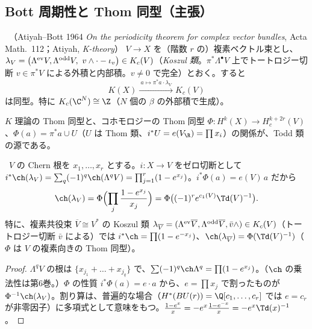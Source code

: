 \subsection{Bott 周期性と Thom 同型（主張）}
\begin{thm}\label{thm:Bott}\tC\ （Atiyah--Bott 1964 \emph{On the periodicity theorem for complex vector bundles}, Acta Math.\ 112；Atiyah, \emph{K-theory}）
$V\to X$ を（階数 $r$ の）複素ベクトル束とし、$\lambda_V=\bigl(\Lambda^{\rm ev}V,\Lambda^{\rm odd}V,\ v\wedge\cdot-\iota_v\bigr)\in K_c(V)$（\emph{Koszul 類}。$\pi^*\Lambda^\bullet V$ 上でトートロジー切断 $v\in\pi^*V$ による外積と内部積。$v\ne0$ で完全）とおく。すると
\[
K(X)\xrightarrow{\ a\mapsto\pi^*a\cdot\lambda_V\ }K_c(V)
\]
は同型。特に $K_c(\C^N)\cong\Z$（$N$ 個の $\beta$ の外部積で生成）。
\end{thm}
$K$ 理論の Thom 同型と、コホモロジーの Thom 同型 $\Phi:H^k(X)\to H^{k+2r}_c(V)$、$\Phi(a)=\pi^*a\cup U$（$U$ は Thom 類、$i^*U=e(V_{\R})=\prod x_i$）の関係が、Todd 類の源である。
\begin{lem}\label{lem:chKoszul}\tP\
$V$ の Chern 根を $x_1,\dots,x_r$ とする。$i:X\to V$ をゼロ切断として $i^*\ch(\lambda_V)=\sum_q(-1)^q\ch(\Lambda^qV)=\prod_{j=1}^r(1-e^{x_j})$。$i^*\Phi(a)=e(V)\,a$ だから
\[
\ch(\lambda_V)=\Phi\Bigl(\prod_j\frac{1-e^{x_j}}{x_j}\Bigr)=\Phi\bigl((-1)^re^{c_1(V)}\Td(V)^{-1}\bigr).
\]
特に、複素共役束 $\overline V\cong V^*$ の Koszul 類 $\lambda_{\overline V}=(\Lambda^{\rm ev}\overline V,\Lambda^{\rm odd}\overline V,\bar v\wedge)\in K_c(V)$（トートロジー切断 $\bar v$ による）では $i^*\ch=\prod(1-e^{-x_j})$、$\ch(\lambda_{\overline V})=\Phi(\Td(V)^{-1})$（$\Phi$ は $V$ の複素向きの Thom 同型）。
\end{lem}
\begin{proof}
$\Lambda^qV$ の根は $\{x_{j_1}+\dots+x_{j_q}\}$ で、$\sum(-1)^q\ch\Lambda^q=\prod(1-e^{x_j})$。（$\ch$ の乗法性は第6巻。）$\Phi$ の性質 $i^*\Phi(a)=e\cdot a$ から、$e=\prod x_j$ で割ったものが $\Phi^{-1}\ch(\lambda_V)$。割り算は、普遍的な場合（$H^*(BU(r))=\Q[c_1,\dots,c_r]$ では $e=c_r$ が非零因子）に多項式として意味をもつ。$\frac{1-e^x}x=-e^x\frac{1-e^{-x}}x=-e^x\Td(x)^{-1}$。
\end{proof}
